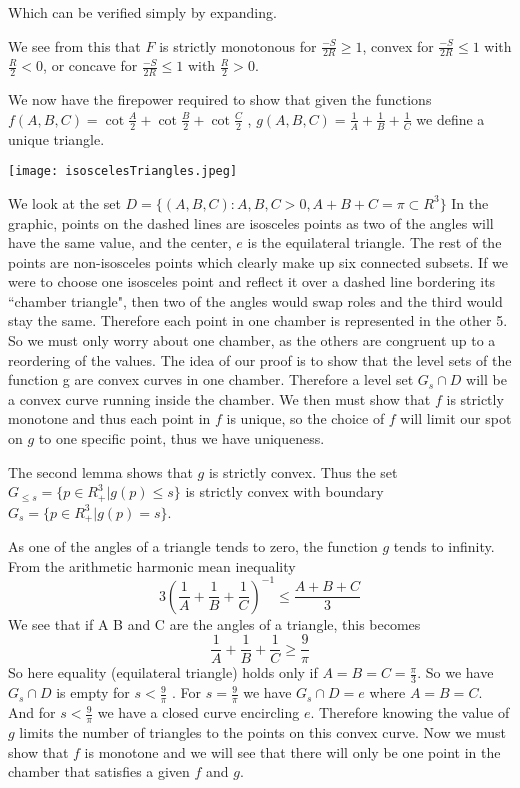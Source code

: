 \documentclass[12pt]{report}
\numberwithin{definition}{section}
\begin{document}
 Which can be verified simply by expanding. 
 
     
   
 	We see from this that $F$ is strictly monotonous for $\frac{-S}{2R}\geq1$, convex for $\frac{-S}{2R}\leq1$ with $\frac{R}{2} < 0$, or concave for $\frac{-S}{2R}\leq1$ with $\frac{R}{2} > 0$.
 
 We now have the firepower required to show that given  the functions $f(A, B, C) = \cot{\frac{A}{2}}+\cot{\frac{B}{2}}+\cot{\frac{C}{2}}$ , $g(A, B, C) = \frac{1}{A}+\frac{1}{B}+\frac{1}{C}$ we define a unique triangle. 
 
      
 
 
\texttt{[image: isoscelesTriangles.jpeg]}
 
 
      
    
 We look at the set $D = \{ ( A, B, C) : A, B, C >0, A+B+C = \pi  \subset R^3\}$
 	In the graphic, points on the dashed lines are isosceles points as two of the angles will have the same value, and the center, $e$ is the equilateral triangle. The rest of the points are non-isosceles points which clearly make up six connected subsets.  If we were to choose one isosceles point and reflect it over a dashed line bordering its ``chamber triangle", then two of the angles would swap roles and the third would stay the same. Therefore each point in one chamber is represented in the other 5. So we must only worry about one chamber, as the others are congruent up to a reordering of the values. The idea of our proof is to show that the level sets of the function g are convex curves in one chamber. Therefore a level set $G_s \cap D$ will be a convex curve running inside the chamber.
	We then must show that $f$ is strictly monotone and thus each point in $f$ is unique, so the choice of $f$ will limit our spot on $g$ to one specific point, thus we have uniqueness. 
	
   
 
 The second lemma shows that $g$ is strictly convex. Thus the set $G_{\leq s} = \{p \in R^3_+ |g(p)\leq s\} $ is strictly convex with boundary $ G_s = {\{p \in R^3_+ | g(p) = s}\}$.
    
 
 As one of the angles of a triangle tends to zero, the function $g$ tends to infinity. From the arithmetic harmonic mean inequality 
 \[
 3 \left(\frac{1}{A}+\frac{1}{B}+\frac{1}{C}\right)^{-1} \leq \frac{A+B+C}{3} 
 \]
 We see that if A B and C are the angles of a triangle, this becomes 
 \[
 \frac{1}{A}+\frac{1}{B}+\frac{1}{C} \geq \frac{9}{\pi}
 \]
 So here equality (equilateral triangle) holds only if $A = B=C  = \frac{\pi}{3} $. 
 So we have $G_s \cap D$ is empty for $ s < \frac{9}{\pi} $ . For $s = \frac{9}{\pi}$ we have 
 $G_s \cap D = {e} $ where $A = B = C$. And for $s < \frac{9}{\pi}$ we have a closed curve encircling $e$. Therefore knowing the value of $g$ limits the number of triangles to the points on this convex curve. Now we must show that $f$ is monotone and we will see that there will only be one point in the chamber that satisfies a given $f$ and $g$.  
 
\end{document}
